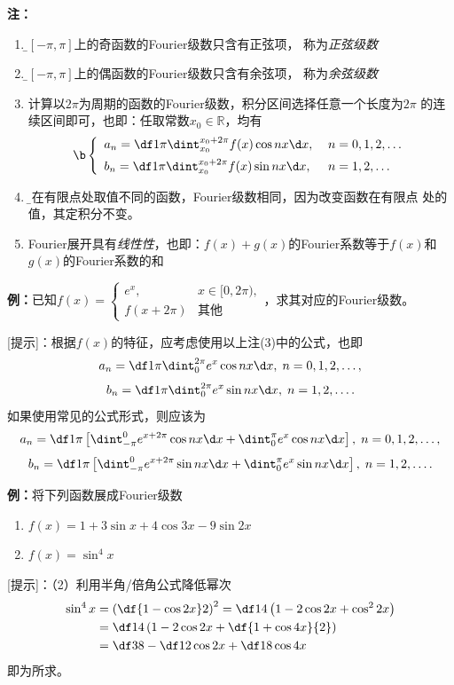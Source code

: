 {\bf 注：}
\begin{enumerate}[(1)]
  \setlength{\itemindent}{1cm}
  \item {\b $[-\pi,\pi]$上的奇函数的Fourier级数只含有正弦项， 称为{\it 正弦级数}}
  \item {\b $[-\pi,\pi]$上的偶函数的Fourier级数只含有余弦项， 称为{\it 余弦级数}}
  \item 计算以$2\pi$为周期的函数的Fourier级数，积分区间选择任意一个长度为$2\pi$
  的连续区间即可，也即：任取常数$x_0\in\mathbb{R}$，均有
  	$${\b\left\{\begin{array}{ll}
		a_n=\df1{\pi}\dint_{x_0}^{x_0+2\pi}f(x)\cos nx\d x,\;& n=0,1,2,\ldots\\[5pt]
		b_n=\df1{\pi}\dint_{x_0}^{x_0+2\pi}f(x)\sin nx\d x,\;& n=1,2,\ldots
  	\end{array}\right.}$$
  \item {\b 只在有限点处取值不同的函数，Fourier级数相同}，因为改变函数在有限点
  处的值，其定积分不变。
  \item Fourier展开具有{\it 线性性}，也即：$f(x)+g(x)$的Fourier系数等于$f(x)$和
  $g(x)$的Fourier系数的和
\end{enumerate}

{\bf 例：}已知$f(x)=\left\{\begin{array}{ll}
	e^x,& x\in[0,2\pi),\\ f(x+2\pi)& \mbox{其他}
\end{array}\right.$，求其对应的Fourier级数。

[提示]：根据$f(x)$的特征，应考虑使用以上注(3)中的公式，也即
$$a_n=\df1{\pi}\dint_{0}^{2\pi}e^x\cos nx\d x,\; n=0,1,2,\ldots,$$
$$b_n=\df1{\pi}\dint_{0}^{2\pi}e^x\sin nx\d x,\; n=1,2,\ldots.$$
如果使用常见的公式形式，则应该为
$$a_n=\df1{\pi}\left[\dint_{-\pi}^{0}e^{x+2\pi}\cos nx\d x+
\dint_{0}^{\pi}e^x\cos nx\d x\right],\; n=0,1,2,\ldots,$$
$$b_n=\df1{\pi}\left[\dint_{-\pi}^{0}e^{x+2\pi}\sin nx\d x+
\dint_{0}^{\pi}e^x\sin nx\d x\right],\; n=1,2,\ldots.$$

{\bf 例：}将下列函数展成Fourier级数
\begin{enumerate}[(1)]
  \setlength{\itemindent}{1cm}
  \item $f(x)=1+3\sin x+4\cos 3x-9\sin 2x$
  \item $f(x)=\sin^4x$
\end{enumerate}

[提示]：（2）利用半角/倍角公式降低幂次
\begin{align*}
	\sin^4x&=\left(\df{1-\cos2x}2\right)^2
	=\df14\left(1-2\cos2x+\cos^22x\right)\\
	&=\df14\left(1-2\cos2x+\df{1+\cos4x}{2}\right)\\
	&=\df38-\df12\cos2x+\df18\cos4x
\end{align*}
即为所求。

